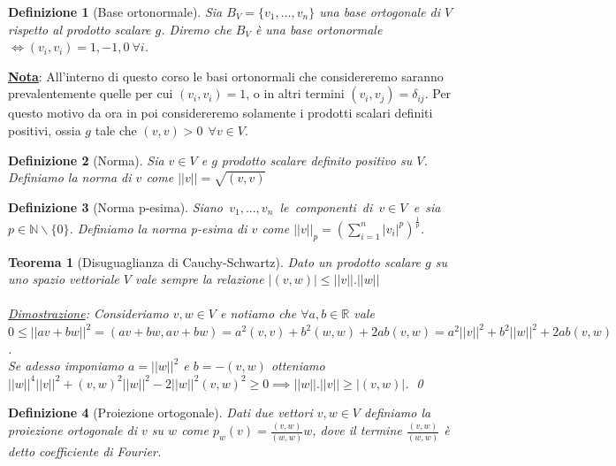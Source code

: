 \documentclass[a4paper,12pt]{report}
\newtheorem{teorema}{Teorema}[chapter]
\newtheorem{definizione}{Definizione}[chapter]
\begin{document}
\begin{definizione}[Base ortonormale]
    Sia $B_V=\{v_1,...,v_n\}$ una base ortogonale di $V$ rispetto al prodotto scalare $g$. Diremo che $B_V$ è una base ortonormale $\iff (v_i,v_i)=1,-1,0 \ \forall i$.
\end{definizione}

\textbf{\underline{Nota}}: All'interno di questo corso le basi ortonormali che considereremo saranno prevalentemente quelle per cui $(v_i,v_i)=1$, o in altri termini $(v_i,v_j)=\delta_{ij}$. Per questo motivo da ora in poi considereremo solamente i prodotti scalari definiti positivi, ossia $g $ tale che $ (v,v) > 0 \ \ \forall v \in V$.

\begin{definizione}[Norma]
      Sia $v \in V$ e $g$ prodotto scalare definito positivo su $V$. Definiamo la norma di $v$ come $||v||=\sqrt{(v,v)}$
\end{definizione}
    
\begin{definizione}[Norma p-esima]\label{def: 1.16}
    \mbox{Siano $v_1,...,v_n$ le componenti di $v \in V$ e sia $p \in \mathbb{N}\backslash\{0\}$}. Definiamo la norma p-esima di $v$ come $ \displaystyle ||v||_p= \left( \sum_{i=1}^n|v_i|^p\right)^{\frac{1}{p}} $.
\end{definizione}

\begin{teorema}[Disuguaglianza di Cauchy-Schwartz]\label{thm: 1.2}
    Dato un prodotto scalare $g$ su uno spazio vettoriale $V$ vale sempre la relazione $|(v,w)| \leq ||v||.||w||$
    \\
    \\ \underline{Dimostrazione}: Consideriamo $v,w \in V$ e notiamo che $\forall a,b \in \mathbb{R}$ vale $0 \leq ||av+bw||^2=(av+bw,av+bw)= a^2(v,v)+b^2(w,w)+2ab(v,w)=a^2||v||^2+b^2||w||^2+2ab(v,w)$. 
    \\Se adesso imponiamo $a=||w||^2$ e $b=-(v,w)$ otteniamo $||w||^4||v||^2+(v,w)^2||w||^2-2||w||^2(v,w)^2 \geq 0 \implies ||w||.||v|| \geq |(v,w)|$. \qed
\end{teorema}

\begin{definizione}[Proiezione ortogonale]
    Dati due vettori $v,w \in V$ definiamo la proiezione ortogonale di $v$ su $w$ come $\displaystyle p_w(v)=\frac{(v,w)}{(w,w)}w$, dove il termine $\displaystyle\frac{(v,w)}{(w,w)}$ è detto coefficiente di Fourier.
\end{definizione}
\end{document}
